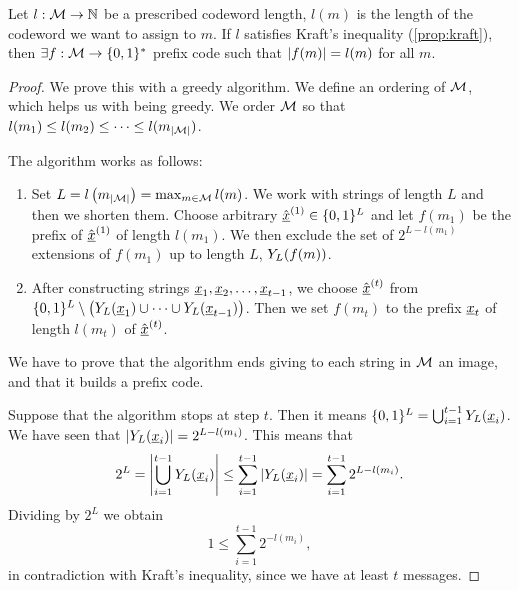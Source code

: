 \begin{thm}
	Let $l : \mathcal{M} \to \mathbb{N}$ be a prescribed codeword length, \ie $l(m)$ is the length of the codeword we want to assign to $m$.
	If $l$ satisfies Kraft's inequality (\cref{prop:kraft}), then 
	$\exists f : \mathcal{M} \to \{0, 1\}^*$ prefix code such that $\left|{f(m)}\right| = l(m)$ for all $m$.
\end{thm}

\begin{proof}
	We prove this with a greedy algorithm.
	We define an ordering of $\mathcal{M}$, which helps us with being greedy.
	We order $\mathcal{M}$ so that $l(m_1) \le l(m_2) \le \dots \le l(m_{\left|{\mathcal{M}}\right|})$.

	The algorithm works as follows:
	\begin{enumerate}
		\item Set $L = l \left( m_{\left|{\mathcal{M}}\right|} \right) = \max_{m \in \mathcal{M}} l(m)$.
			We work with strings of length $L$ and then we shorten them.
			Choose arbitrary $\hat{\underline{x}}^{(1)} \in \{0, 1\}^L$ and let $f(m_1)$ be the prefix of $\hat{\underline{x}}^{(1)}$ of length $l(m_1)$.
			We then exclude the set of $2^{L - l(m_1)}$ extensions of $f(m_1)$ up to length $L$, \ie $Y_L(f(m))$.

		\item After constructing strings $\underline{x}_1,\underline{x}_2, \dots, \underline{x}_{t-1}$, we choose $\hat{\underline{x}}^{(t)}$ from $\{0, 1\}^L \setminus \left( Y_L(\underline{x}_1) \cup \dots \cup Y_L(\underline{x}_{t-1}) \right)$.
			Then we set $f(m_t)$ to the prefix $\underline{x}_t$ of length $l(m_t)$ of $\hat{\underline{x}}^{(t)}$.
	\end{enumerate}

	We have to prove that the algorithm ends giving to each string in $\mathcal{M}$ an image, and that it builds a prefix code.

	Suppose that the algorithm stops at step $t$.
	Then it means $\{0, 1\}^L = \bigcup_{i = 1}^{t-1} Y_L(\underline{x}_i)$. We have seen that $\left|{Y_L(\underline{x}_i)}\right| = 2^{L - l(m_i)}$. This means that
	\begin{equation*}
		2^L
		=
		\left|{\bigcup_{i = 1}^{t-1} Y_L(\underline{x}_i)}\right|
		\leq
		\sum_{i = 1}^{t-1} \left|{Y_L(\underline{x}_i)}\right|
		=
		\sum_{i = 1}^{t-1} 2^{L-l(m_i)}.
	\end{equation*}
	Dividing by $2^L$ we obtain
	\begin{equation*}
		1 \leq \sum_{i = 1}^{t-1} 2^{-l(m_i)},
	\end{equation*}
	in contradiction with Kraft's inequality, since we have at least $t$ messages. 


\end{proof}
